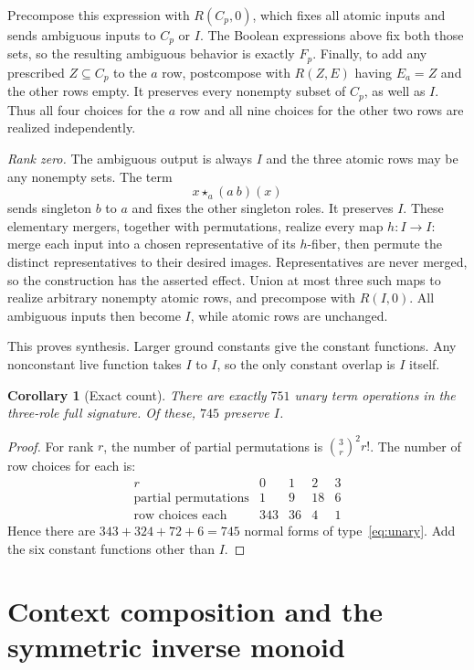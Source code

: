 \documentclass[11pt]{article}
\newtheorem{corollary}[theorem]{Corollary}
\newcommand{\ow}[1]{\mathbin{\star_{#1}}}
\begin{document}
Precompose this expression with $R(C_p,0)$, which fixes all atomic inputs
and sends ambiguous inputs to $C_p$ or $I$. The Boolean expressions
above fix both those sets, so the resulting ambiguous behavior is
exactly $F_p$. Finally, to add any prescribed $Z\subseteq C_p$ to the
$a$ row, postcompose with $R(Z,E)$ having $E_a=Z$ and the other rows
empty. It preserves every nonempty subset of $C_p$, as well as $I$.
Thus all four choices for the $a$ row and all nine choices for the other
two rows are realized independently.

\emph{Rank zero.} The ambiguous output is always $I$ and the three
atomic rows may be any nonempty sets. The term
\[
 x\ow a(a\ b)(x)
\]
sends singleton $b$ to $a$ and fixes the other singleton roles. It
preserves $I$. These elementary mergers, together with permutations,
realize every map $h:I\to I$: merge each input into a chosen
representative of its $h$-fiber, then permute the distinct representatives
to their desired images. Representatives are never merged, so the
construction has the asserted effect. Union at most three such maps
to realize arbitrary nonempty atomic rows, and precompose with $R(I,0)$.
All ambiguous inputs then become $I$, while atomic rows are unchanged.

This proves synthesis. Larger ground constants give the constant
functions. Any nonconstant live function takes $I$ to $I$, so the only
constant overlap is $I$ itself.

\begin{corollary}[Exact count]
There are exactly $751$ unary term operations in the three-role full
signature. Of these, $745$ preserve $I$.
\end{corollary}
\begin{proof}
For rank $r$, the number of partial permutations is
$\binom3r^2r!$. The number of row choices for each is:
\[
\begin{array}{c|rrrr}
 r&0&1&2&3\\\hline
 \text{partial permutations}&1&9&18&6\\
 \text{row choices each}&343&36&4&1
\end{array}
\]
Hence there are $343+324+72+6=745$ normal forms of
type~\eqref{eq:unary}. Add the six constant functions other than $I$.
\end{proof}

\section{Context composition and the symmetric inverse monoid}
\end{document}
